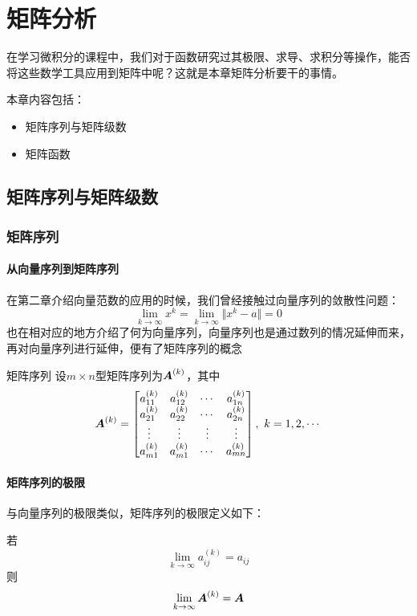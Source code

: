 \documentclass[12pt, a4paper, oneside, UTF8]{ctexbook}
\begin{document}
\else
\fi
\chapter{矩阵分析}
在学习微积分的课程中，我们对于函数研究过其极限、求导、求积分等操作，能否将这些数学工具应用到矩阵中呢？这就是本章矩阵分析要干的事情。

本章内容包括：
\begin{itemize}[leftmargin=4em]
    \item 矩阵序列与矩阵级数
    \item 矩阵函数
\end{itemize}

\section{矩阵序列与矩阵级数}
\subsection{矩阵序列}
\subsubsection{从向量序列到矩阵序列}
在第二章介绍向量范数的应用的时候，我们曾经接触过向量序列的敛散性问题：\[\lim\limits_{k\to\infty}x^{k}=\lim\limits_{k\to\infty}\Vert x^{k}-a\Vert=0\]
也在相对应的地方介绍了何为向量序列，向量序列也是通过数列的情况延伸而来，再对向量序列进行延伸，便有了矩阵序列的概念
\begin{defn}{矩阵序列}{}
    设$m\times n$型矩阵序列为$\boldsymbol{A}^{(k)}$，其中\[\boldsymbol{A}^{(k)}=\begin{bmatrix}
        a_{11}^{(k)}&a_{12}^{(k)}&\cdots&a_{1n}^{(k)}\\
        a_{21}^{(k)}&a_{22}^{(k)}&\cdots&a_{2n}^{(k)}\\
        \vdots&\vdots&\vdots&\vdots\\
        a_{m1}^{(k)}&a_{m1}^{(k)}&\cdots&a_{mn}^{(k)}\\
    \end{bmatrix},\ k=1,2,\cdots\]
\end{defn}
\subsubsection{矩阵序列的极限}
与向量序列的极限类似，矩阵序列的极限定义如下：
\begin{defn}{}{}
    若\[\lim\limits_{k\to\infty}a^{(k)}_{ij}=a_{ij}\]则\[\lim\limits_{k\to\infty}\boldsymbol{A}^{(k)}=\boldsymbol{A}\]
\end{defn}
\end{document}
